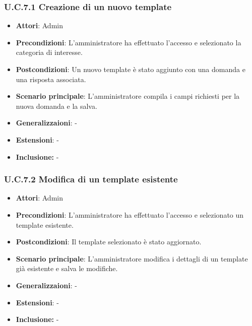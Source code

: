 \subsubsection{U.C.7.1 Creazione di un nuovo template}
\begin{itemize}
    \item \textbf{Attori}: Admin
    \item \textbf{Precondizioni}: L’amministratore ha effettuato l’accesso e selezionato la categoria di interesse.
    \item \textbf{Postcondizioni}: Un nuovo template è stato aggiunto con una domanda e una risposta associata.
    \item \textbf{Scenario principale}: L’amministratore compila i campi richiesti per la nuova domanda e la salva.
    \item \textbf{Generalizzaioni}: -
    \item \textbf{Estensioni}: -
    \item \textbf{Inclusione:} -
\end{itemize}
\subsubsection{U.C.7.2 Modifica di un template esistente}
\begin{itemize}
    \item \textbf{Attori}: Admin
    \item \textbf{Precondizioni}: L’amministratore ha effettuato l’accesso e selezionato un template esistente.
    \item \textbf{Postcondizioni}: Il template selezionato è stato aggiornato.
    \item \textbf{Scenario principale}: L’amministratore modifica i dettagli di un template già esistente e salva le modifiche.
    \item \textbf{Generalizzaioni}: -
    \item \textbf{Estensioni}: -
    \item \textbf{Inclusione:} -
\end{itemize}
